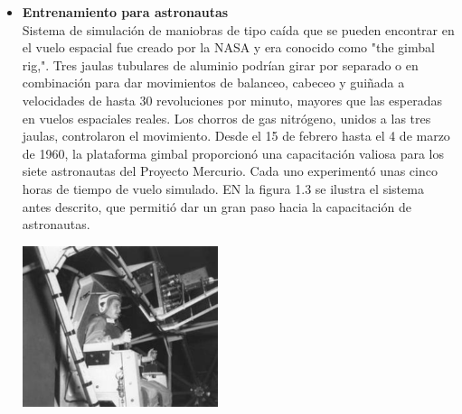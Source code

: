 \begin{itemize}
	\item \textbf{Entrenamiento para astronautas}\\
	      Sistema de simulación de maniobras de tipo caída que se pueden encontrar en el vuelo espacial
	      fue creado por la NASA y era conocido como "the gimbal rig,".
	      Tres jaulas tubulares de aluminio podrían girar por separado o en combinación para
	      dar movimientos de balanceo, cabeceo y guiñada a velocidades de hasta 30
	      revoluciones por minuto, mayores que las esperadas en vuelos espaciales reales.
	      Los chorros de gas nitrógeno, unidos a las tres jaulas, controlaron el movimiento.
	      Desde el 15 de febrero hasta el 4 de marzo de 1960, la plataforma gimbal
	      proporcionó una capacitación valiosa para los siete astronautas del Proyecto
	      Mercurio. Cada uno experimentó unas cinco horas de tiempo de vuelo simulado.\cite{WEB:MERCURY} EN la figura 1.3 se ilustra el sistema antes descrito, que permitió dar un gran
	      paso hacia la capacitación de astronautas.
	      \begin{center}
		      \includegraphics[width=0.45\textwidth]{Contenido/Cuerpo/Capitulo1/Fig3.eps}
		      \label{fig:Introduccion:Fig4}
	      \end{center}


\end{itemize}
